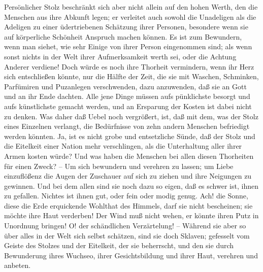 Persönlicher Stolz beschränkt sich aber nicht allein auf den hohen Werth, den
die Menschen aus ihre Abkunft legen; er verleitet auch sowohl die Unadeligen als
die Adeligen zu einer üdertriebenen Schätzung ihrer Personen, besondere wenn sie
auf körperliche Schönheit Anspruch machen können. Es ist zum Bewundern, wenn man
siehet, wie sehr Einige von ihrer Person eingenommen sind; als wenn sonst nichts
in der Welt ihrer Aufmerksamkeit werth sei, oder die Achtung Anderer verdiene!
Doch würde es noch ihre Thorheit vermindern, wenn ihr Herz sich entschließen
könnte, nur die Hälfte der Zeit, die sie mit Waschen, Schminken, Parfümiren und
Puzanlegen verschwenden, dazu anzuwenden, daß sie an Gott und an ihr Ende
dachten. Alle jene Dinge müssen aufs pünklichste besorgt und aufs künstlichste
gemacht werden, und an Ersparung der Kosten ist dabei nicht zu denken. Was daher
daß Uebel noch vergrößert, ist, daß mit dem, was der Stolz eines Einzelnen
verlangt, die Bedürfnisse von zehn andern Menschen befriedigt werden könnten.
Ja, ist es nicht grobe und entsetzliche Sünde, daß der Stolz und die Eitelkeit
einer Nation mehr verschlingen, als die Unterhaltung aller ihrer Armen kosten
würde? Und was haben die Menschen bei allen diesen Thorheiten für einen Zweck?
-- Um sich bewundern und verehren zu lassen; um Liebe einzuflößenz die Augen der
Zuschauer auf sich zu ziehen und ihre Neigungen zu gewinnen. Und bei dem allen
sind sie noch dazu so eigen, daß es schwer ist, ihnen zu gefallen. Nichtes ist
ihnen gut, oder fein oder modig genug. Ach! die Sonne, diese die Erde
erquickende Wohlthat des Himmels, darf sie nicht bescheinen; sie möchte ihre
Haut verderben! Der Wind muß nicht wehen, er könnte ihren Putz in Unordnung
bringen! O! der schändlichen Verzärtelung! -- Während sie aber so über alles in
der Welt sich selbst schätzen, sind sie doch Sklaven; gefesselt vom Geiste des
Stolzes und der Eitelkeit, der sie beherrscht, und den sie durch Bewunderung
ihres Wuchseo, ihrer Gesichtsbildung und ihrer Haut, verehren und anbeten.

